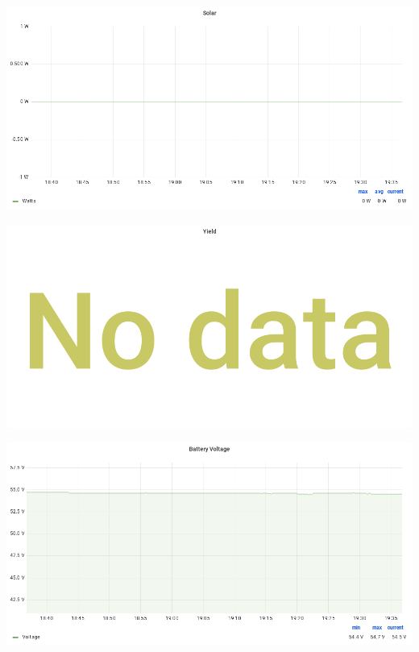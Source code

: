 \documentclass{article}
\begin{document}
\begin{center}
\par
\vspace{0.5cm}
\par
\vspace{0.5cm}
\includegraphics[width=\textwidth]{image10}
\par
\vspace{0.5cm}
\par
\vspace{0.5cm}
\includegraphics[width=\textwidth]{image22}
\par
\vspace{0.5cm}
\par
\vspace{0.5cm}
\includegraphics[width=\textwidth]{image26}

\end{center}
\end{document}
